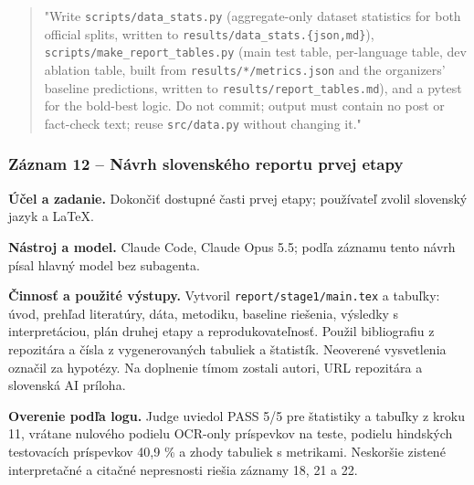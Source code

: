 \begin{quote}\normalsize "Write \texttt{scripts/\allowbreak{}data\_\allowbreak{}stats.\allowbreak{}py} (aggregate-only dataset statistics for both official splits, written to \texttt{results/\allowbreak{}data\_\allowbreak{}stats.\allowbreak{}\{json,\allowbreak{}md\}}), \texttt{scripts/\allowbreak{}make\_\allowbreak{}report\_\allowbreak{}tables.\allowbreak{}py} (main test table, per-language table, dev ablation table, built from \texttt{results/\allowbreak{}*/\allowbreak{}metrics.\allowbreak{}json} and the organizers' baseline predictions, written to \texttt{results/\allowbreak{}report\_\allowbreak{}tables.\allowbreak{}md}), and a pytest for the bold-best logic. Do not commit; output must contain no post or fact-check text; reuse \texttt{src/\allowbreak{}data.\allowbreak{}py} without changing it."\end{quote}

\subsubsection*{Záznam 12 -- Návrh slovenského reportu prvej etapy}


\par\noindent \textbf{Účel a zadanie.} Dokončiť dostupné časti prvej etapy; používateľ zvolil slovenský jazyk a LaTeX.\par\smallskip
\par\noindent \textbf{Nástroj a model.} Claude Code, Claude Opus 5.5; podľa záznamu tento návrh písal hlavný model bez subagenta.\par\smallskip
\par\noindent \textbf{Činnosť a použité výstupy.} Vytvoril \texttt{report/\allowbreak{}stage1/\allowbreak{}main.\allowbreak{}tex} a tabuľky: úvod, prehľad literatúry, dáta, metodiku, baseline riešenia, výsledky s interpretáciou, plán druhej etapy a reprodukovateľnosť. Použil bibliografiu z repozitára a čísla z vygenerovaných tabuliek a štatistík. Neoverené vysvetlenia označil za hypotézy. Na doplnenie tímom zostali autori, URL repozitára a slovenská AI príloha.\par\smallskip
\par\noindent \textbf{Overenie podľa logu.} Judge uviedol PASS 5/5 pre štatistiky a tabuľky z kroku 11, vrátane nulového podielu OCR-only príspevkov na teste, podielu hindských testovacích príspevkov 40,9 \% a zhody tabuliek s metrikami. Neskoršie zistené interpretačné a citačné nepresnosti riešia záznamy 18, 21 a 22.\par\smallskip

